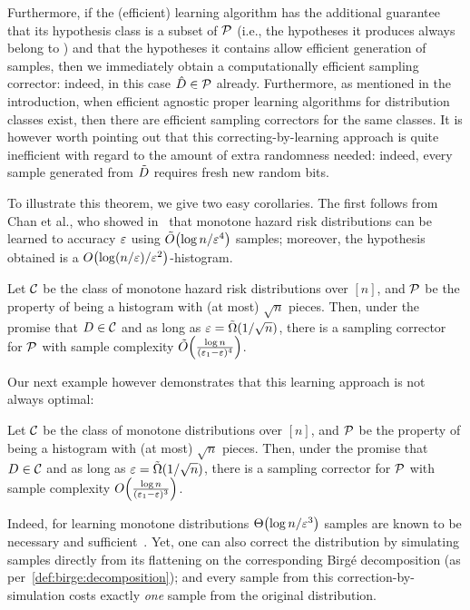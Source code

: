 Furthermore, if the (efficient) learning algorithm \Learner has the additional guarantee that its hypothesis class is a subset of $\mathcal{P}$ (i.e., the hypotheses it produces always belong to \property) and that the hypotheses it contains allow efficient generation of samples, then we immediately obtain a computationally efficient sampling corrector: indeed, in this case $\hat{D}\in\mathcal{P}$ already.
Furthermore, as mentioned in the introduction, when efficient agnostic proper learning algorithms for distribution classes exist, then there are efficient sampling correctors for the same classes.  It is however worth pointing out that this correcting-by-learning approach is quite inefficient with regard to the amount of extra randomness needed: indeed, every sample generated from $\tilde{D}$ requires fresh new random bits.

To illustrate this theorem, we give two easy corollaries. The first follows from Chan et al., who showed in~\cite{CDSS:13} that monotone hazard risk distributions can be learned to accuracy $\varepsilon$ using $\tildeO{{\log n}/{\eps^4}}$ samples; moreover, the hypothesis obtained is a $\bigO{\log (n/\eps)/\eps^2}$-histogram.
\begin{corollary}
Let $\mathcal{C}$ be the class of monotone hazard risk distributions over $[n]$, and $\mathcal{P}$ be the property of being
a histogram with (at most) $\sqrt{n}$ pieces. Then, under the promise that 
$D\in\mathcal{C}$ and as long as $\varepsilon=\tilde{\Omega}(1/\sqrt{n})$, there is a sampling corrector for $\mathcal{P}$ with sample complexity $\tildeO{\frac{\log n}{(\eps_1-\eps)^4}}$.
\end{corollary}
\noindent Our next example however demonstrates that this learning approach is not always optimal:
\begin{corollary}
Let $\mathcal{C}$ be the class of monotone distributions over $[n]$, and $\mathcal{P}$ be the property of being
a histogram with (at most) $\sqrt{n}$ pieces. Then, under the promise that 
$D\in\mathcal{C}$ and as long as $\varepsilon=\tilde{\Omega}(1/\sqrt{n})$, there is a sampling corrector for $\mathcal{P}$ with sample complexity $\bigO{\frac{\log n}{(\eps_1-\eps)^3}}$.
\end{corollary}
\noindent Indeed, for learning monotone distributions $\bigTheta{{\log n}/{\eps^3}}$ samples are known to be necessary and sufficient~\cite{Birge:87}. 
Yet, one can also correct the distribution by simulating samples directly from its flattening on the corresponding Birg\'e decomposition (as per~\autoref{def:birge:decomposition}); and every sample from this correction-by-simulation costs exactly \emph{one} sample from the original distribution.

